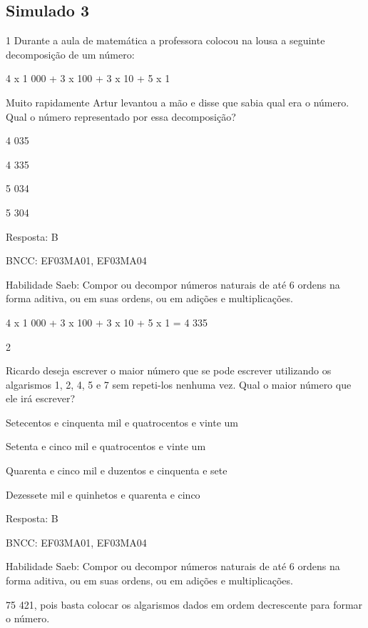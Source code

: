 \begin{escolha}
{\begin{escolha}
{\chapter{Simulado 3}

\num{1} Durante a aula de matemática a professora colocou na lousa
a seguinte decomposição de um número:

4 x 1 000 + 3 x 100 + 3 x 10 + 5 x 1

Muito rapidamente Artur levantou a mão e disse que sabia qual era o
número. Qual o número representado por essa decomposição?

\begin{escolha}
\item
  4 035
\item
  4 335
\item
  5 034
\item
  5 304
\end{escolha}

Resposta: B

BNCC: EF03MA01, EF03MA04

Habilidade Saeb: Compor ou decompor números naturais de até 6 ordens na
forma aditiva, ou em suas ordens, ou em adições e multiplicações.

4 x 1 000 + 3 x 100 + 3 x 10 + 5 x 1 = 4 335

\num{2}

Ricardo deseja escrever o maior número que se pode escrever utilizando
os algarismos 1, 2, 4, 5 e 7 sem repeti-los nenhuma vez. Qual o maior
número que ele irá escrever?

\begin{escolha}
\item
  Setecentos e cinquenta mil e quatrocentos e vinte um
\item
  Setenta e cinco mil e quatrocentos e vinte um
\item
  Quarenta e cinco mil e duzentos e cinquenta e sete
\item
  Dezessete mil e quinhetos e quarenta e cinco
\end{escolha}

Resposta: B

BNCC: EF03MA01, EF03MA04

Habilidade Saeb: Compor ou decompor números naturais de até 6 ordens na
forma aditiva, ou em suas ordens, ou em adições e multiplicações.

75 421, pois basta colocar os algarismos dados em ordem decrescente para
formar o número.

}
\end{escolha}}
\end{escolha}
